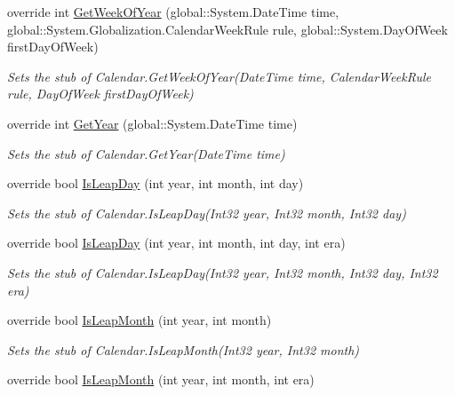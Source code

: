\begin{DoxyCompactItemize}
override int \hyperlink{class_system_1_1_globalization_1_1_fakes_1_1_stub_calendar_a818199064945c851e298eecf846b6079}{Get\-Week\-Of\-Year} (global\-::\-System.\-Date\-Time time, global\-::\-System.\-Globalization.\-Calendar\-Week\-Rule rule, global\-::\-System.\-Day\-Of\-Week first\-Day\-Of\-Week)
\begin{DoxyCompactList}\small\item\em Sets the stub of Calendar.\-Get\-Week\-Of\-Year(\-Date\-Time time, Calendar\-Week\-Rule rule, Day\-Of\-Week first\-Day\-Of\-Week)\end{DoxyCompactList}\item 
override int \hyperlink{class_system_1_1_globalization_1_1_fakes_1_1_stub_calendar_a4036d7c44f36f0cd64a8c7d325e6ee09}{Get\-Year} (global\-::\-System.\-Date\-Time time)
\begin{DoxyCompactList}\small\item\em Sets the stub of Calendar.\-Get\-Year(\-Date\-Time time)\end{DoxyCompactList}\item 
override bool \hyperlink{class_system_1_1_globalization_1_1_fakes_1_1_stub_calendar_a31f2a83ce8cfb8c3c4eb24ccf9d635b3}{Is\-Leap\-Day} (int year, int month, int day)
\begin{DoxyCompactList}\small\item\em Sets the stub of Calendar.\-Is\-Leap\-Day(\-Int32 year, Int32 month, Int32 day)\end{DoxyCompactList}\item 
override bool \hyperlink{class_system_1_1_globalization_1_1_fakes_1_1_stub_calendar_aee3fda2da611b9abd07aeda5f5f04a15}{Is\-Leap\-Day} (int year, int month, int day, int era)
\begin{DoxyCompactList}\small\item\em Sets the stub of Calendar.\-Is\-Leap\-Day(\-Int32 year, Int32 month, Int32 day, Int32 era)\end{DoxyCompactList}\item 
override bool \hyperlink{class_system_1_1_globalization_1_1_fakes_1_1_stub_calendar_affb349ebb7aff0b016a3f87ee0b5be7b}{Is\-Leap\-Month} (int year, int month)
\begin{DoxyCompactList}\small\item\em Sets the stub of Calendar.\-Is\-Leap\-Month(\-Int32 year, Int32 month)\end{DoxyCompactList}\item 
override bool \hyperlink{class_system_1_1_globalization_1_1_fakes_1_1_stub_calendar_a74240e8b383918f6617d2ee2d834b429}{Is\-Leap\-Month} (int year, int month, int era)

\end{DoxyCompactItemize}
